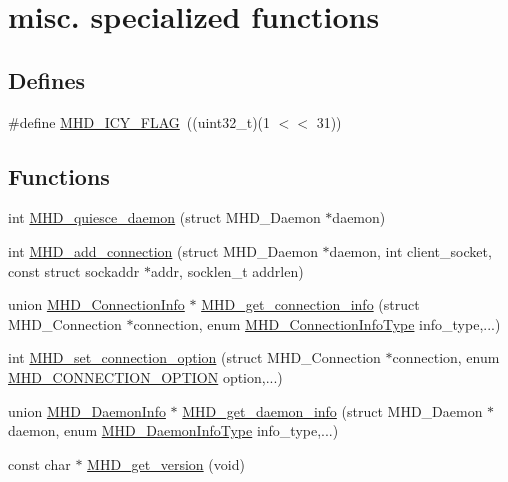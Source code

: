 \hypertarget{group__specialized}{\section{misc. specialized functions}
\label{group__specialized}
}
\subsection*{\-Defines}
\begin{DoxyCompactItemize}
\item 
\#define \hyperlink{group__specialized_ga9b99fd01c2ee8c3af6c37b9362cfc22f}{\-M\-H\-D\-\_\-\-I\-C\-Y\-\_\-\-F\-L\-A\-G}~((uint32\-\_\-t)(1 $<$$<$ 31))
\end{DoxyCompactItemize}
\subsection*{\-Functions}
\begin{DoxyCompactItemize}
\item 
int \hyperlink{group__specialized_gad2cf1c48fa42eba717d279b56d3139fa}{\-M\-H\-D\-\_\-quiesce\-\_\-daemon} (struct \-M\-H\-D\-\_\-\-Daemon $\ast$daemon)
\item 
int \hyperlink{group__specialized_gad0f4cc99f1c930f7c822b558f4c7c7f5}{\-M\-H\-D\-\_\-add\-\_\-connection} (struct \-M\-H\-D\-\_\-\-Daemon $\ast$daemon, int client\-\_\-socket, const struct sockaddr $\ast$addr, socklen\-\_\-t addrlen)
\item 
union \hyperlink{unionMHD__ConnectionInfo}{\-M\-H\-D\-\_\-\-Connection\-Info} $\ast$ \hyperlink{group__specialized_ga7cdd0533d5d2f8d1fd60b6fb0330be43}{\-M\-H\-D\-\_\-get\-\_\-connection\-\_\-info} (struct \-M\-H\-D\-\_\-\-Connection $\ast$connection, enum \hyperlink{group__request_gacd49a2d4da7c25367ad62ce4ff030453}{\-M\-H\-D\-\_\-\-Connection\-Info\-Type} info\-\_\-type,...)
\item 
int \hyperlink{group__specialized_ga227416ab73d086a9d921662a9f191074}{\-M\-H\-D\-\_\-set\-\_\-connection\-\_\-option} (struct \-M\-H\-D\-\_\-\-Connection $\ast$connection, enum \hyperlink{microhttpd_8h_afc2e88045dfc98cd0c09681dbb0777cc}{\-M\-H\-D\-\_\-\-C\-O\-N\-N\-E\-C\-T\-I\-O\-N\-\_\-\-O\-P\-T\-I\-O\-N} option,...)
\item 
union \hyperlink{unionMHD__DaemonInfo}{\-M\-H\-D\-\_\-\-Daemon\-Info} $\ast$ \hyperlink{group__specialized_gaf914a078113d88ef92ca8d280b240f4d}{\-M\-H\-D\-\_\-get\-\_\-daemon\-\_\-info} (struct \-M\-H\-D\-\_\-\-Daemon $\ast$daemon, enum \hyperlink{microhttpd_8h_ad5569c25fa51b4062251a8a22f5854b7}{\-M\-H\-D\-\_\-\-Daemon\-Info\-Type} info\-\_\-type,...)
\item 
const char $\ast$ \hyperlink{group__specialized_gad86011194f474164e3d7118ba32d92e0}{\-M\-H\-D\-\_\-get\-\_\-version} (void)
\end{DoxyCompactItemize}


